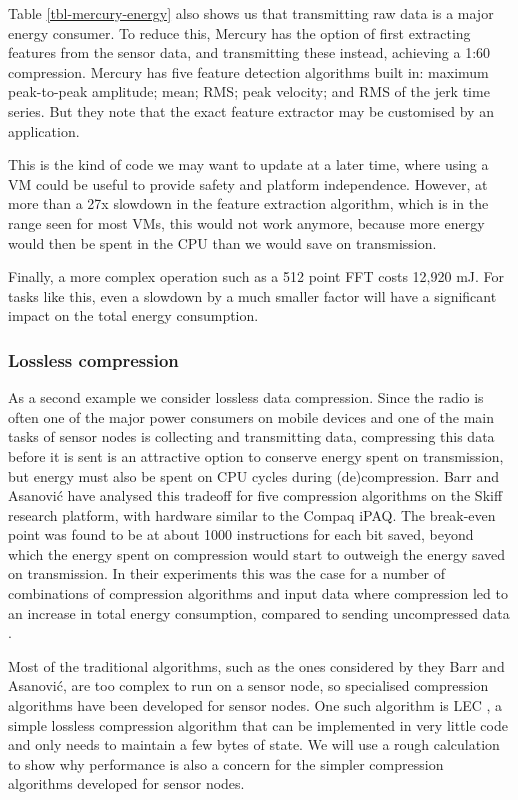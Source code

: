 Table \ref{tbl-mercury-energy} also shows us that transmitting raw data is a major energy consumer. To reduce this, Mercury has the option of first extracting features from the sensor data, and transmitting these instead, achieving a 1:60 compression. Mercury has five feature detection algorithms built in: maximum peak-to-peak amplitude; mean; RMS; peak velocity; and RMS of the jerk time series. But they note that the exact feature extractor may be customised by an application.

This is the kind of code we may want to update at a later time, where using a VM could be useful to provide safety and platform independence. However, at more than a 27x slowdown in the feature extraction algorithm, which is in the range seen for most VMs, this would not work anymore, because more energy would then be spent in the CPU than we would save on transmission.

Finally, a more complex operation such as a 512 point FFT costs 12,920 mJ. For tasks like this, even a slowdown by a much smaller factor will have a significant impact on the total energy consumption.

\subsubsection{Lossless compression}
As a second example we consider lossless data compression. Since the radio is often one of the major power consumers on mobile devices and one of the main tasks of sensor nodes is collecting and transmitting data, compressing this data before it is sent is an attractive option to conserve energy spent on transmission, but energy must also be spent on CPU cycles during (de)compression. Barr and Asanovi\'c have analysed this tradeoff for five compression algorithms on the Skiff research platform, with hardware similar to the Compaq iPAQ. The break-even point was found to be at about 1000 instructions for each bit saved, beyond which the energy spent on compression would start to outweigh the energy saved on transmission. In their experiments this was the case for a number of combinations of compression algorithms and input data where compression led to an increase in total energy consumption, compared to sending uncompressed data \cite{Barr:2006vg}.

Most of the traditional algorithms, such as the ones considered by they Barr and Asanovi\'c, are too complex to run on a sensor node, so specialised compression algorithms have been developed for sensor nodes. One such algorithm is LEC \cite{Marcelloni:2009ja}, a simple lossless compression algorithm that can be implemented in very little code and only needs to maintain a few bytes of state. We will use a rough calculation to show why performance is also a concern for the simpler compression algorithms developed for sensor nodes.

